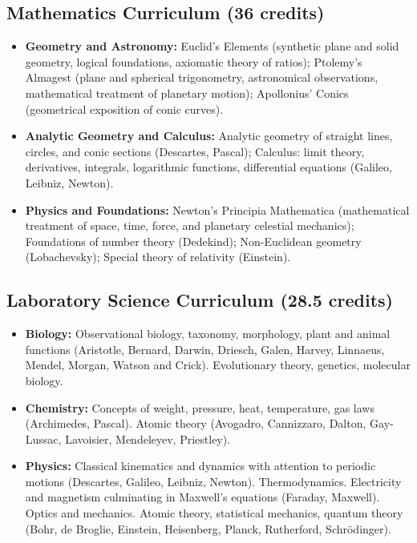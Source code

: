 \documentclass[11pt]{article}
\begin{document}
\subsection{Mathematics Curriculum \mdseries(36 credits)}
\begin{itemize}[noitemsep, topsep=0pt]
    \item \textbf{Geometry and Astronomy:} Euclid's Elements (synthetic plane and solid geometry, logical foundations, axiomatic theory of ratios); Ptolemy's Almagest (plane and spherical trigonometry, astronomical observations, mathematical treatment of planetary motion); Apollonius' Conics (geometrical exposition of conic curves).
    \item \textbf{Analytic Geometry and Calculus:} Analytic geometry of straight lines, circles, and conic sections (Descartes, Pascal); Calculus: limit theory, derivatives, integrals, logarithmic functions, differential equations (Galileo, Leibniz, Newton).
    \item \textbf{Physics and Foundations:} Newton's Principia Mathematica (mathematical treatment of space, time, force, and planetary celestial mechanics); Foundations of number theory (Dedekind); Non-Euclidean geometry (Lobachevsky); Special theory of relativity (Einstein).
\end{itemize}

\subsection{Laboratory Science Curriculum \mdseries(28.5 credits)}
\begin{itemize}[noitemsep, topsep=0pt]
    \item \textbf{Biology:} Observational biology, taxonomy, morphology, plant and animal functions (Aristotle, Bernard, Darwin, Driesch, Galen, Harvey, Linnaeus, Mendel, Morgan, Watson and Crick). Evolutionary theory, genetics, molecular biology.
    \item \textbf{Chemistry:} Concepts of weight, pressure, heat, temperature, gas laws (Archimedes, Pascal). Atomic theory (Avogadro, Cannizzaro, Dalton, Gay-Lussac, Lavoisier, Mendeleyev, Priestley).
    \item \textbf{Physics:} Classical kinematics and dynamics with attention to periodic motions (Descartes, Galileo, Leibniz, Newton). Thermodynamics. Electricity and magnetism culminating in Maxwell's equations (Faraday, Maxwell). Optics and mechanics. Atomic theory, statistical mechanics, quantum theory (Bohr, de Broglie, Einstein, Heisenberg, Planck, Rutherford, Schrödinger).
\end{itemize}
\end{document}
